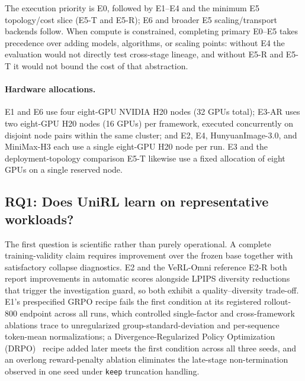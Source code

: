 \documentclass[10pt]{article}
\begin{document}
The execution priority is E0, followed by E1--E4 and the minimum E5 topology/cost slice (E5-T and E5-R); E6 and broader E5 scaling/transport backends follow.
When compute is constrained, completing primary E0--E5 takes precedence over adding models, algorithms, or scaling points: without E4 the evaluation would not directly test cross-stage lineage, and without E5-R and E5-T it would not bound the cost of that abstraction.

\paragraph{Hardware allocations.}
E1 and E6 use four eight-GPU NVIDIA H20 nodes (32 GPUs total); E3-AR uses two eight-GPU H20 nodes (16 GPUs) per framework, executed concurrently on disjoint node pairs within the same cluster; and E2, E4, HunyuanImage-3.0, and MiniMax-H3 each use a single eight-GPU H20 node per run.
E3 and the deployment-topology comparison E5-T likewise use a fixed allocation of eight GPUs on a single reserved node.

\subsection{RQ1: Does UniRL learn on representative workloads?}
\label{sec:rq1}

The first question is scientific rather than purely operational.
A complete training-validity claim requires improvement over the frozen base together with satisfactory collapse diagnostics.
E2 and the VeRL-Omni reference E2-R both report improvements in automatic scores alongside LPIPS diversity reductions that trigger the investigation guard, so both exhibit a quality--diversity trade-off.
E1's prespecified GRPO recipe fails the first condition at its registered rollout-800 endpoint across all runs, which controlled single-factor and cross-framework ablations trace to unregularized group-standard-deviation and per-sequence token-mean normalizations; a Divergence-Regularized Policy Optimization (DRPO)~\citep{yao2026rethinking} recipe added later meets the first condition across all three seeds, and an overlong reward-penalty ablation eliminates the late-stage non-termination observed in one seed under \texttt{keep} truncation handling.
\end{document}
